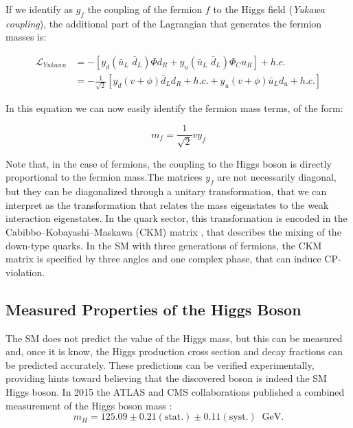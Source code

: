 If we identify as $g_f$ the coupling of the fermion $f$ to the Higgs field (\textit{Yukawa coupling}), the additional part of the Lagrangian that generates the fermion masses is:

\begin{equation}
\begin{aligned}
\mathcal{L}_{Yukawa} &= - \left[  y_d \left( \bar{u}_L \,\, \bar{d}_L  \right) \Phi d_R +  y_u \left( \bar{u}_L \,\, \bar{d}_L  \right) \Phi_C u_R \right] + h.c. \\
&= - \frac{1}{\sqrt{2}} \left[  y_d \left( v + \phi \right) \bar{d}_L d_R + h.c. + y_u \left( v + \phi \right) \bar{u}_L d_u + h.c. \right] 
\end{aligned}
\end{equation}

\noindent In this equation we can now easily identify the fermion mass terms, of the form:

\begin{equation}
m_f =  \frac{1}{\sqrt{2}} v y_f
\end{equation}

Note that, in the case of fermions, the coupling to the Higgs boson is directly proportional to the fermion mass.The matrices $y_f$ are not necessarily diagonal, but they can be diagonalized through a unitary transformation, that we can interpret as the transformation that relates the mass eigenstates to the weak interaction eigenstates. In the quark sector, this transformation is encoded in the Cabibbo–Kobayashi–Maskawa (CKM) matrix \cite{Cabibbo:1963yz}\cite{Kobayashi:1973fv}, that describes the mixing of the down-type quarks. In the SM with three generations of fermions, the CKM matrix is specified by three angles and one complex phase, that can induce CP-violation.

\subsection{Measured Properties of the Higgs Boson}

The SM does not predict the value of the Higgs mass, but this can be measured and, once it is know, the Higgs production cross section and decay fractions can be predicted accurately. These predictions can be verified experimentally, providing hints toward believing that the discovered boson is indeed the SM Higgs boson. In 2015 the ATLAS and CMS collaborations published a combined measurement of the Higgs boson mass \cite{Aad:2015zhl}:
\begin{equation}
m_H = 125.09 \pm 0.21 (\mathrm{stat.}) \pm 0.11 (\mathrm{syst.}) \;\; \mathrm{GeV}.
\end{equation}


